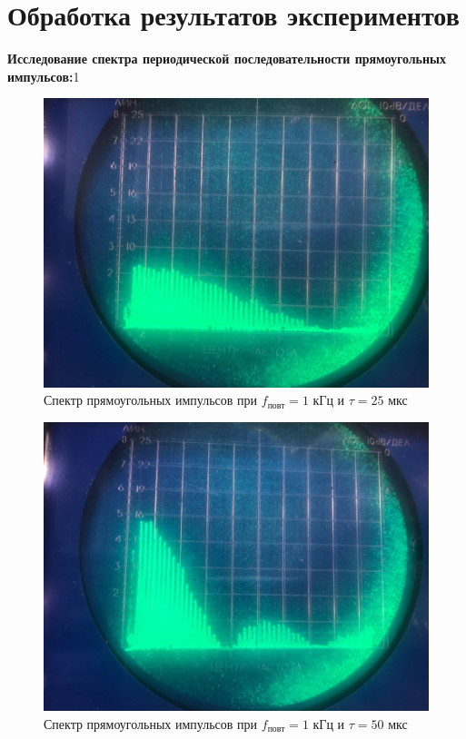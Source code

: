\documentclass[a4paper, fontsize=14pt]{article}
\begin{document}
\section*{Обработка результатов экспериментов}
\textbf{Исследование спектра периодической последовательности прямоугольных импульсов:}1
\begin{figure}[H]
\center
\includegraphics[scale=0.3]{1.jpg}
\caption{Спектр прямоугольных импульсов при $f_\text{повт} = 1$ кГц и $\tau = 25$ мкс}
\end{figure}
\begin{figure}[H]
\center
\includegraphics[scale=0.3]{2.jpg}
\caption{Спектр прямоугольных импульсов при $f_\text{повт} = 1$ кГц и $\tau = 50$ мкс}
\end{figure}
\end{document}
